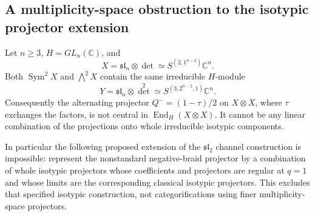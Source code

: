 \subsection{A multiplicity-space obstruction to the isotypic projector extension}

\begin{proposition}
Let $n\ge3$, $H=GL_n(\mathbb C)$, and
\[
 X=\mathfrak{sl}_n\otimes\det
       \simeq S^{(2,1^{n-2})}\mathbb C^n.
                                                               \tag{P-F61a}
\]
Both $\operatorname{Sym}^2X$ and $\bigwedge^2X$ contain the
same irreducible $H$-module
\[
 Y=\mathfrak{sl}_n\otimes\det^2
       \simeq S^{(3,2^{n-2},1)}\mathbb C^n.
                                                               \tag{P-F61b}
\]
Consequently the alternating projector
$Q^-=(1-\tau)/2$ on $X\otimes X$, where $\tau$ exchanges the
factors, is not central in $\operatorname{End}_H(X\otimes X)$.
It cannot be any linear combination of the projections onto
whole irreducible isotypic components.

In particular the following proposed extension of the
$\mathfrak{sl}_2$ channel construction is impossible: represent
the nonstandard negative-braid projector by a combination of
whole isotypic projectors whose coefficients and projectors
are regular at $q=1$ and whose limits are the corresponding
classical isotypic projectors.  This excludes that specified
isotypic construction, not categorifications using finer
multiplicity-space projectors.
\end{proposition}

